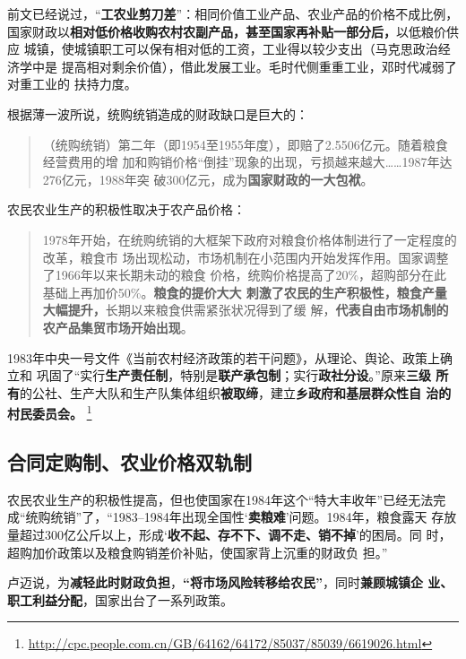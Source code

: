 前文已经说过，“\textbf{工农业剪刀差}”：相同价值工业产品、农业产品的价格不成比例，
国家财政以\textbf{相对低价格收购农村农副产品，甚至国家再补贴一部分后，}以低粮价供应
城镇，使城镇职工可以保有相对低的工资，工业得以较少支出（马克思政治经济学中是
提高相对剩余价值），借此发展工业。毛时代侧重重工业，邓时代减弱了对重工业的
扶持力度。


根据薄一波所说，统购统销造成的财政缺口是巨大的：
\begin{quotation}
  （统购统销）第二年（即1954至1955年度），即赔了2.5506亿元。随着粮食经营费用的增
  加和购销价格“倒挂”现象的出现，亏损越来越大……1987年达276亿元，1988年突
  破300亿元，成为\textbf{国家财政的一大包袱}。
\end{quotation}

农民农业生产的积极性取决于农产品价格：
\begin{quotation}
  1978年开始，在统购统销的大框架下政府对粮食价格体制进行了一定程度的改革，粮食市
  场出现松动，市场机制在小范围内开始发挥作用。国家调整了1966年以来长期未动的粮食
  价格，统购价格提高了20\%，超购部分在此基础上再加价50\%。\textbf{粮食的提价大大
    刺激了农民的生产积极性，粮食产量大幅提升，}长期以来粮食供需紧张状况得到了缓
  解，\textbf{代表自由市场机制的农产品集贸市场开始出现}。\cite{taochangsheng}
\end{quotation}

1983年中央一号文件《当前农村经济政策的若干问题》，从理论、舆论、政策上确立和
巩固了“实行\textbf{生产责任制}，特别是\textbf{联产承包制}；实行\textbf{政社分设}。”原来\textbf{三级
  所有}的公社、生产大队和生产队集体组织\textbf{被取缔}，建立\textbf{乡政府和基层群众性自
  治的村民委员会。}
\footnote{\url{http://cpc.people.com.cn/GB/64162/64172/85037/85039/6619026.html}}

\subsection{合同定购制、农业价格双轨制}
\label{sec:nongshuanggui}

农民农业生产的积极性提高，但也使国家在1984年这个“特大丰收年”已经无法完
成“统购统销”了，“1983--1984年出现全国性‘\textbf{卖粮难}’问题。1984年，粮食露天
存放量超过300亿公斤以上，形成‘\textbf{收不起、存不下、调不走、销不掉}’的困局。同
时，超购加价政策以及粮食购销差价补贴，使国家背上沉重的财政负
担。”\cite{liangshi40}

卢迈说，为\textbf{减轻此时财政负担}，\textbf{“将市场风险转移给农民”}，同时\textbf{兼顾城镇企
  业、职工利益分配}，国家出台了一系列政策。

